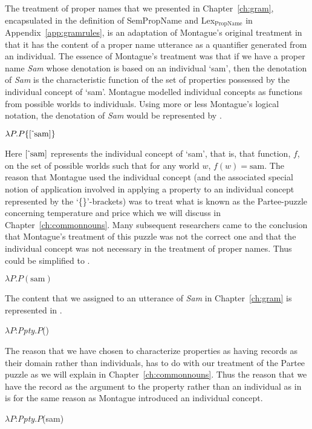 The treatment of proper names that we presented in
Chapter~\ref{ch:gram}, encapsulated in the definition of SemPropName
and Lex$_{\mathrm{PropName}}$
in Appendix~\ref{app:gramrules}, is an adaptation of Montague's
original treatment in that it has the content of a proper name utterance
as a quantifier generated from an individual.  The essence of
Montague's treatment was that if we have a proper name \textit{Sam}
whose denotation is based on an individual `sam', then the denotation
of \textit{Sam} is the characteristic function of the set of
properties possessed by the individual concept of `sam'.  Montague
modelled individual concepts as functions from possible worlds to
individuals.  Using more or less Montague's logical notation, the denotation of
\textit{Sam} would be represented by \nexteg{}.
\begin{ex} 
$\lambda P.P\{[\,\hat{}\,\mathrm{sam}]\}$ 
\label{ex:MontagueSam}
\end{ex} 
Here $[\,\hat{}\,\mathrm{sam}]$ represents the individual concept of `sam',
that is,
that function, $f$, on the set of possible worlds such that for any
world $w$, $f(w)=\mathrm{sam}$.  The reason that Montague used the
individual concept (and the associated special notion of application
involved in applying a property to an individual concept represented
by the `\{\}'-brackets) was to treat what is known as the Partee-puzzle
concerning temperature and price which we will discuss in Chapter~\ref{ch:commonnouns}.  Many
subsequent researchers came to the conclusion that Montague's treatment of
this puzzle was not the correct one and that the individual concept
was not necessary in the treatment of proper names.  Thus \preveg{}
could be simplified to \nexteg{}.
\begin{ex} 
$\lambda P.P(\mathrm{sam})$ 
\end{ex} 
The content that we assigned to an utterance of \textit{Sam} in
Chapter~\ref{ch:gram} is represented in \nexteg{}.
\begin{ex} 
$\lambda P$:\textit{Ppty}.$P$() 
\end{ex} 
The reason that we have chosen to characterize properties as having
records as their domain rather than individuals, has to do with our
treatment of the Partee puzzle as we will explain in Chapter~\ref{ch:commonnouns}.  Thus the
reason that we have the record  as the
argument to the property rather than an individual as in \nexteg{} is for the same reason as
Montague introduced an individual concept.
\begin{ex} 
$\lambda P$:\textit{Ppty}.$P$(sam) 
\end{ex} 
